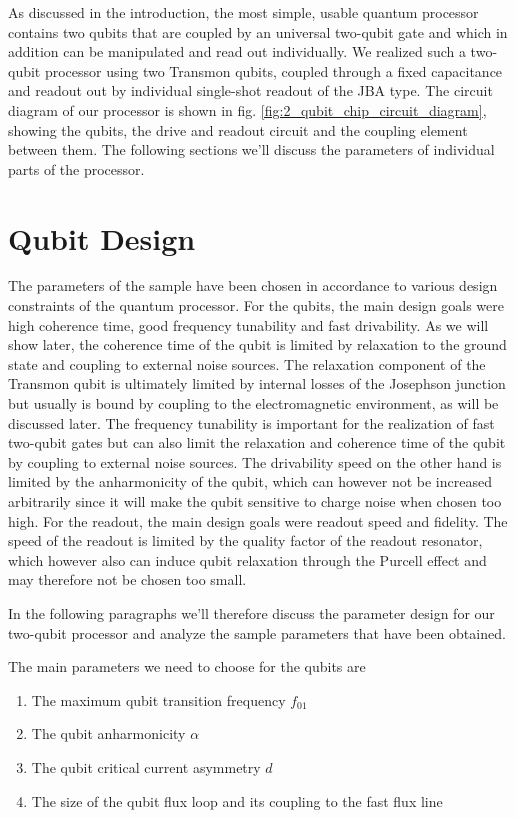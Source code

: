 As discussed in the introduction, the most simple, usable quantum processor contains two qubits that are coupled by an universal two-qubit gate and which in addition can be manipulated and read out individually. We realized such a two-qubit processor using two Transmon qubits, coupled through a fixed capacitance and readout out by individual single-shot readout of the JBA type. The circuit diagram of our processor is shown in fig. \ref{fig:2_qubit_chip_circuit_diagram}, showing the qubits, the drive and readout circuit and the coupling element between them. The following sections we'll discuss the parameters of individual parts of the processor.

\section{Qubit Design}

The parameters of the sample have been chosen in accordance to various design constraints of the quantum processor. For the qubits, the main design goals were high coherence time, good frequency tunability and fast drivability. As we will show later, the coherence time of the qubit is limited by relaxation to the ground state and coupling to external noise sources. The relaxation component of the Transmon qubit is ultimately limited by internal losses of the Josephson junction but usually is bound by coupling to the electromagnetic environment, as will be discussed later. The frequency tunability is important for the realization of fast two-qubit gates but can also limit the relaxation and coherence time of the qubit by coupling to external noise sources. The drivability speed on the other hand is limited by the anharmonicity of the qubit, which can however not be increased arbitrarily since it will make the qubit sensitive to charge noise when chosen too high. For the readout, the main design goals were readout speed and fidelity. The speed of the readout is limited by the quality factor of the readout resonator, which however also can induce qubit relaxation through the Purcell effect and may therefore not be chosen too small.

In the following paragraphs we'll therefore discuss the parameter design for our two-qubit processor and analyze the sample parameters that have been obtained.

The main parameters we need to choose for the qubits are

\begin{enumerate}
\item The maximum qubit transition frequency $f_{01}$
\item The qubit anharmonicity $\alpha$
\item The qubit critical current asymmetry $d$
\item The size of the qubit flux loop and its coupling to the fast flux line
\end{enumerate}

